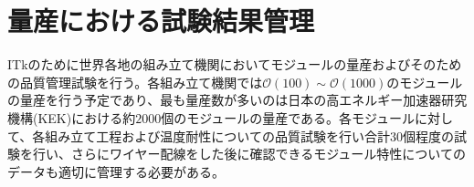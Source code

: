 \section{量産における試験結果管理}
\label{sec:production-manage}

ITkのために世界各地の組み立て機関においてモジュールの量産およびそのための品質管理試験を行う。各組み立て機関では$\mathcal{O}(100)\sim \mathcal{O}(1000)$のモジュールの量産を行う予定であり、最も量産数が多いのは日本の高エネルギー加速器研究機構(KEK)における約$2000$個のモジュールの量産である。各モジュールに対して、各組み立て工程および温度耐性についての品質試験を行い合計$30$個程度の試験を行い、さらにワイヤー配線をした後に確認できるモジュール特性についてのデータも適切に管理する必要がある。

